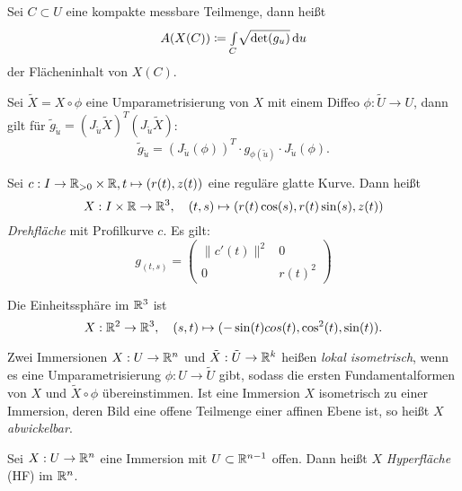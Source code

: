 \documentclass{cheat-sheet}
\begin{document}
\begin{defn}
  Sei $C \subset U$ eine kompakte messbare Teilmenge, dann heißt
  \[ A(X(C)) \coloneqq {\textstyle \int\limits_{C}^{}}  \sqrt{\det(g_u)}  \,\mathrm{d} u \]
  der Flächeninhalt von $X(C)$.
\end{defn}

\begin{satz}
  Sei $\tilde{X} = X \circ \phi$ eine Umparametrisierung von $X$ mit einem Diffeo $\phi : \tilde{U} \to U$, dann gilt für $\tilde{g}_{\tilde{u}} = (J_{\tilde{u}} \tilde{X})^T (J_{\tilde{u}} \tilde{X})$:
  \[ \tilde{g}_{\tilde{u}} = (J_{\tilde{u}}(\phi))^T \cdot g_{\phi(\tilde{u})} \cdot J_{\tilde{u}}(\phi). \]
\end{satz}

\begin{bsp}[Drehfläche]
  Sei $c : I \to \mathbb{R}_{> 0} \times \mathbb{R}, t \mapsto (r(t), z(t))$ eine reguläre glatte Kurve. Dann heißt
  \[ X : I \times \mathbb{R} \to \mathbb{R}^3, \quad (t, s) \mapsto (r(t) \cos(s), r(t) \sin(s), z(t)) \]
  \emph{Drehfläche} mit Profilkurve $c$. Es gilt:
  \[ g_{(t, s)} = \begin{pmatrix} \| c'(t) \|^2 & 0 \\ 0 & r(t)^2 \end{pmatrix} \]
\end{bsp}

\begin{bsp}[Kugelfläche] Die Einheitssphäre im $\mathbb{R}^3$ ist
\[ X : \mathbb{R}^2 \to \mathbb{R}^3, \quad (s, t) \mapsto (- \sin(t) cos(t), \cos^2(t), \sin(t)). \]
\end{bsp}

\begin{defn}
  Zwei Immersionen $X : U \to \mathbb{R}^n$ und $\tilde{X} : \tilde{U} \to \mathbb{R}^k$ heißen \emph{lokal isometrisch}, wenn es eine Umparametrisierung $\phi : U \to \tilde{U}$ gibt, sodass die ersten Fundamentalformen von $X$ und $\tilde{X} \circ \phi$ übereinstimmen. Ist eine Immersion $X$ isometrisch zu einer Immersion, deren Bild eine offene Teilmenge einer affinen Ebene ist, so heißt $X$ \emph{abwickelbar}.
\end{defn}


\begin{defn}
  Sei $X : U \to \mathbb{R}^n$ eine Immersion mit $U \subset \mathbb{R}^{n-1}$ offen. Dann heißt $X$ \emph{Hyperfläche} (HF) im $\mathbb{R}^n$.
\end{defn}
\end{document}
